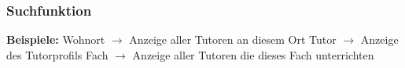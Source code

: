  \begin{frame}
   \frametitle{Suchfunktion}
    \textbf{Beispiele:} \newline
   Wohnort $\rightarrow$ Anzeige aller Tutoren an diesem Ort \newline
    Tutor $\rightarrow$ Anzeige des Tutorprofils \newline
    Fach $\rightarrow$ Anzeige aller Tutoren die dieses Fach unterrichten \newline
 \end{frame}
 